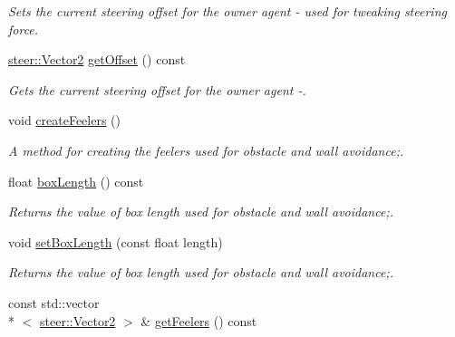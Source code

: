 \begin{DoxyCompactItemize}
\begin{DoxyCompactList}\small\item\em Sets the current steering offset for the owner agent -\/ used for tweaking steering force. \end{DoxyCompactList}\item 
\hyperlink{structsteer_1_1_vector2}{steer\-::\-Vector2} \hyperlink{classsteer_1_1_agent_adbe78075e9c9e4bb4dc5355ba68fa3af}{get\-Offset} () const 
\begin{DoxyCompactList}\small\item\em Gets the current steering offset for the owner agent -\/. \end{DoxyCompactList}\item 
\hypertarget{classsteer_1_1_agent_a2270f8a98159dd4fbb8ad30a0e74ef11}{void \hyperlink{classsteer_1_1_agent_a2270f8a98159dd4fbb8ad30a0e74ef11}{create\-Feelers} ()}\label{classsteer_1_1_agent_a2270f8a98159dd4fbb8ad30a0e74ef11}

\begin{DoxyCompactList}\small\item\em A method for creating the feelers used for obstacle and wall avoidance;. \end{DoxyCompactList}\item 
\hypertarget{classsteer_1_1_agent_aef80b80a4bad78fb564d6891e6928a2f}{float \hyperlink{classsteer_1_1_agent_aef80b80a4bad78fb564d6891e6928a2f}{box\-Length} () const }\label{classsteer_1_1_agent_aef80b80a4bad78fb564d6891e6928a2f}

\begin{DoxyCompactList}\small\item\em Returns the value of box length used for obstacle and wall avoidance;. \end{DoxyCompactList}\item 
void \hyperlink{classsteer_1_1_agent_a219803145249f452cb11c566a906214d}{set\-Box\-Length} (const float length)
\begin{DoxyCompactList}\small\item\em Returns the value of box length used for obstacle and wall avoidance;. \end{DoxyCompactList}\item 
\hypertarget{classsteer_1_1_agent_a424e5fc99388933b1da711b5d1308ff4}{const std\-::vector\\*
$<$ \hyperlink{structsteer_1_1_vector2}{steer\-::\-Vector2} $>$ \& \hyperlink{classsteer_1_1_agent_a424e5fc99388933b1da711b5d1308ff4}{get\-Feelers} () const }\label{classsteer_1_1_agent_a424e5fc99388933b1da711b5d1308ff4}


\end{DoxyCompactItemize}
